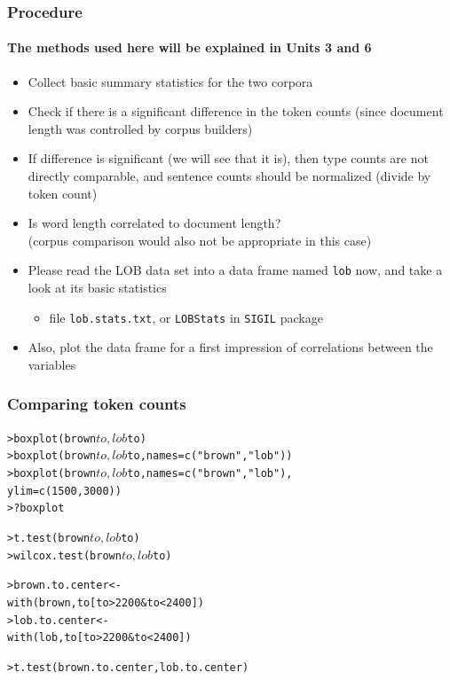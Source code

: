\documentclass[t]{beamer} %
\begin{document}
\begin{frame}
  \frametitle{Procedure}
  \framesubtitle{The methods used here will be explained in Units 3 and 6}

    \begin{itemize}
    \item Collect basic summary statistics for the two corpora
    \item Check if there is a significant difference in the token counts
      (since document length was controlled by corpus builders)
    \item If difference is significant (we will see that it is), then
      type counts are not directly comparable, and sentence
      counts should be normalized (divide by token count)
    \item Is word length correlated to document length?\\
      (corpus comparison would also not be appropriate in this case)%
      \pause
    \item Please read the LOB data set into a data frame named \texttt{lob}
      now, and take a look at its basic statistics
      \begin{itemize}
      \item file \texttt{lob.stats.txt}, or \texttt{LOBStats} in \texttt{SIGIL} package
      \end{itemize}
    \item Also, plot the data frame for a first impression of correlations
      between the variables
    \end{itemize}

\end{frame}

\begin{frame}[fragile]
  \frametitle{Comparing token counts}

\ungap[1]
\begin{alltt}
> boxplot(brown$to,lob$to)
> boxplot(brown$to,lob$to,names=c("brown","lob"))
> boxplot(brown$to,lob$to,names=c("brown","lob"),
  ylim=c(1500,3000))
> ?boxplot

> t.test(brown$to, lob$to)
> wilcox.test(brown$to, lob$to)

> brown.to.center <- 
  with(brown, to[to > 2200 & to < 2400])
> lob.to.center <- 
  with(lob, to[to > 2200 & to < 2400])

> t.test(brown.to.center, lob.to.center)

\end{alltt}

\end{frame}
\end{document}
